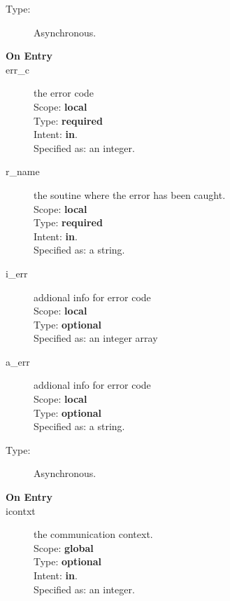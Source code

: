 \begin{description}
\item[Type:] Asynchronous.
\item[\bf On Entry]
\item[err\_c] the error code\\
Scope: {\bf local} \\
Type: {\bf required}\\
Intent: {\bf in}.\\
Specified as: an integer.
\item[r\_name] the soutine where the error has been caught.\\
Scope: {\bf local} \\
Type: {\bf required}\\
Intent: {\bf in}.\\
Specified as: a string.\\
\item[i\_err] addional info for error code\\
Scope: {\bf local} \\
Type: {\bf optional}\\
Specified as: an integer array\\
\item[a\_err] addional info for error code\\
Scope: {\bf local} \\
Type: {\bf optional}\\
Specified as: a string.\\
\end{description}



\begin{description}
\item[Type:] Asynchronous.
\item[\bf On Entry]
\item[icontxt] the communication context.\\
Scope: {\bf global} \\
Type: {\bf optional}\\
Intent: {\bf in}.\\
Specified as: an integer.
\end{description}




